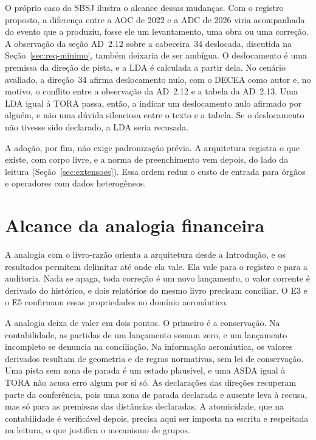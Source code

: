 O próprio caso do SBSJ ilustra o alcance dessas mudanças. Com o registro proposto, a diferença entre a AOC de 2022 e a ADC de 2026 viria acompanhada do evento que a produziu, fosse ele um levantamento, uma obra ou uma correção. A observação da seção AD~2.12 sobre a cabeceira~34 deslocada, discutida na Seção~\ref{sec:req-minimo}, também deixaria de ser ambígua. O deslocamento é uma premissa da direção de pista, e a LDA é calculada a partir dela. No cenário avaliado, a direção~34 afirma deslocamento nulo, com o DECEA como autor e, no motivo, o conflito entre a observação da AD~2.12 e a tabela da AD~2.13. Uma LDA igual à TORA passa, então, a indicar um deslocamento nulo afirmado por alguém, e não uma dúvida silenciosa entre o texto e a tabela. Se o deslocamento não tivesse sido declarado, a LDA seria recusada.

A adoção, por fim, não exige padronização prévia. A arquitetura registra o que existe, com corpo livre, e a norma de preenchimento vem depois, do lado da leitura (Seção~\ref{sec:extensoes}). Essa ordem reduz o custo de entrada para órgãos e operadores com dados heterogêneos.

\section{Alcance da analogia financeira}\label{sec:disc-analogia}

A analogia com o livro-razão orienta a arquitetura desde a Introdução, e os resultados permitem delimitar até onde ela vale. Ela vale para o registro e para a auditoria. Nada se apaga, toda correção é um novo lançamento, o valor corrente é derivado do histórico, e dois relatórios do mesmo livro precisam conciliar. O E3 e o E5 confirmam essas propriedades no domínio aeronáutico.

A analogia deixa de valer em dois pontos. O primeiro é a conservação. Na contabilidade, as partidas de um lançamento somam zero, e um lançamento incompleto se denuncia na conciliação. Na informação aeronáutica, os valores derivados resultam de geometria e de regras normativas, sem lei de conservação. Uma pista sem zona de parada é um estado plausível, e uma ASDA igual à TORA não acusa erro algum por si só. As declarações das direções recuperam parte da conferência, pois uma zona de parada declarada e ausente leva à recusa, mas só para as premissas das distâncias declaradas. A atomicidade, que na contabilidade é verificável depois, precisa aqui ser imposta na escrita e respeitada na leitura, o que justifica o mecanismo de grupos.

